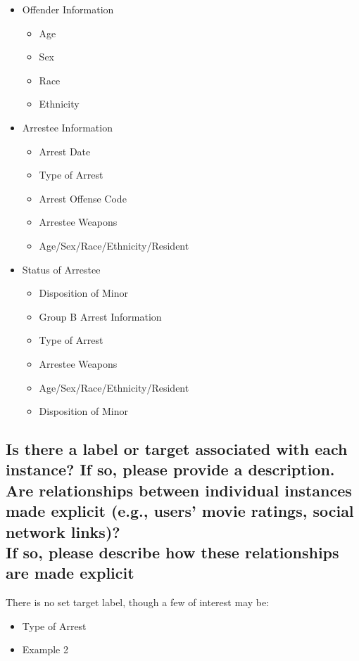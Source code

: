 \documentclass[letterpaper, 10 pt, conference]{ieeeconf}  %
\newcommand{\subtitle}[1]{{\\ \small \normalfont \color{purple} #1}}
\begin{document}
\begin{itemize}
\begin{itemize}
    \end{itemize}
    \item Offender Information
    \begin{itemize}
        \item Age
        \item Sex
        \item Race
        \item Ethnicity
    \end{itemize}
    \item Arrestee Information
    \begin{itemize}
        \item Arrest Date
        \item Type of Arrest
        \item Arrest Offense Code
        \item Arrestee Weapons
        \item Age/Sex/Race/Ethnicity/Resident
    \end{itemize}
    \item Status of Arrestee
    \begin{itemize}
        \item Disposition of Minor
        \item Group B Arrest Information
        \item Type of Arrest
        \item Arrestee Weapons
        \item Age/Sex/Race/Ethnicity/Resident
        \item Disposition of Minor
    \end{itemize}
\end{itemize}



\subsection{Is there a label or target associated with each instance? If so, please provide a description. Are relationships between individual instances made explicit (e.g., users’ movie ratings, social network links)? \subtitle{If so, please describe how these relationships are made explicit}}

There is no set target label, though a few of interest may be:

\begin{itemize}
    \item Type of Arrest
    \item Example 2
\end{itemize}
\end{document}
